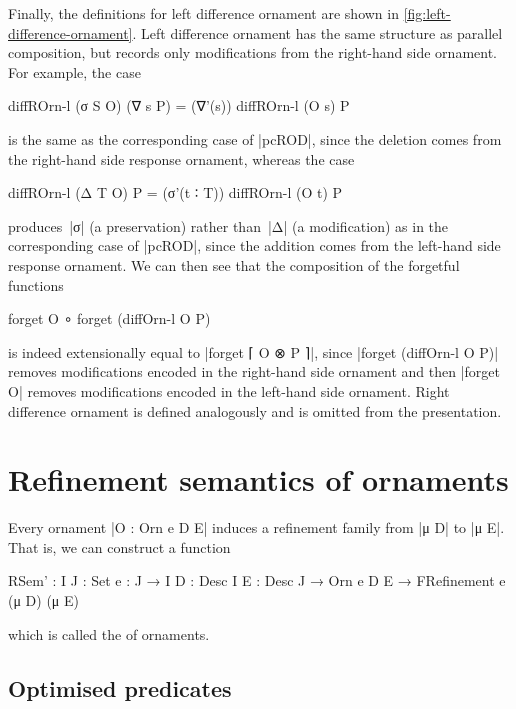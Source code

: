 Finally, the definitions for left difference ornament are shown in \autoref{fig:left-difference-ornament}.
Left difference ornament has the same structure as parallel composition, but records only modifications from the right-hand side ornament.
For example, the case
\begin{code}
diffROrn-l (σ S O) (∇ s P) = (∇'(s)) diffROrn-l (O s) P
\end{code}
is the same as the corresponding case of |pcROD|, since the deletion comes from the right-hand side response ornament, whereas the case
\begin{code}
diffROrn-l (Δ T O) P = (σ'(t ∶ T)) diffROrn-l (O t) P
\end{code}
produces~|σ| (a preservation) rather than~|Δ| (a modification) as in the corresponding case of |pcROD|, since the addition comes from the left-hand side response ornament.
We can then see that the composition of the forgetful functions
\begin{code}
forget O ∘ forget (diffOrn-l  O P)
\end{code}
is indeed extensionally equal to |forget ⌈ O ⊗ P ⌉|, since |forget (diffOrn-l O P)| removes modifications encoded in the right-hand side ornament and then |forget O| removes modifications encoded in the left-hand side ornament.
Right difference ornament is defined analogously and is omitted from the presentation.

\section{Refinement semantics of ornaments}
\label{sec:refinement-semantics}

Every ornament |O : Orn e D E| induces a refinement family from |μ D| to |μ E|.
That is, we can construct a function
\begin{code}
RSem' :  {I J : Set} {e : J → I} {D : Desc I} {E : Desc J} →
         Orn e D E → FRefinement e (μ D) (μ E)
\end{code}
which is called the  of ornaments.


\subsection{Optimised predicates}
\label{sec:optimised-predicates}

